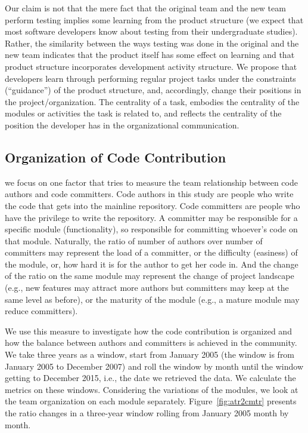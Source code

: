 \documentclass{sig-alternate-05-2015}
\begin{document}
Our claim is not that the mere fact that the original team and the new team 
perform testing implies some learning from the product structure (we expect 
that most software developers know about testing from their undergraduate 
studies). Rather, the similarity between the ways testing was done in the 
original and the new team indicates that the product itself has some effect 
on learning and that product structure incorporates development activity 
structure.
We propose that developers learn through performing regular project tasks 
under the constraints (``guidance'') of the product structure, and, accordingly, 
change their positions in the project/organization. The centrality of a task, 
embodies the centrality of the modules or activities the task is related to, 
and reflects the centrality of the position the developer has in the 
organizational communication.


\subsection{Organization of Code Contribution} %
we focus on one factor that tries to measure the team relationship between
code authors and code committers. Code authors in this study are people who
write the code that gets into the mainline repository. Code committers are
people who have the privilege to write the repository. A committer may be
responsible for a specific module (functionality), so responsible for committing
whoever's code on that module. 
Naturally, the ratio
of number of authors over number of committers may represent the load of a committer,
or the difficulty (easiness) of the module, or, how hard it is for the author to 
get her code in. And the change of the ratio on the same module may represent
the change of project landscape (e.g., new features may attract more authors but
committers may keep at the same level as before), or the maturity of the module (e.g.,
a mature module may reduce committers). 

We use this measure to investigate how 
the code contribution is organized and how the balance
between authors and committers is achieved in the community.
We take three years as a window, start from January 2005 (the window
is from January 2005 to December 2007) and roll the window by month until the window
getting to December 2015, i.e., the date we retrieved the data.
We calculate the metrics on these windows.
Considering the variations of the modules, we look at the team organization
on each module separately.
Figure~\ref{fig:atr2cmtr} presents the ratio changes in a three-year window
rolling from January 2005 month by month.
\end{document}
